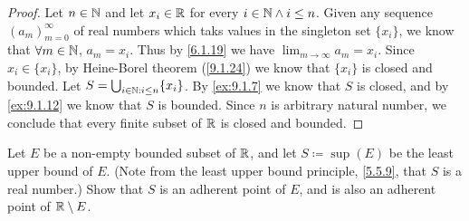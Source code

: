 \begin{proof}
  Let \(n \in \mathbb{N}\) and let \(x_i \in \mathbb{R}\) for every \(i \in \mathbb{N} \land i \leq n\).
  Given any sequence \((a_m)_{m = 0}^\infty\) of real numbers which taks values in the singleton set \(\{x_i\}\), we know that \(\forall m \in \mathbb{N}\), \(a_m = x_i\).
  Thus by \cref{6.1.19} we have \(\lim_{m \to \infty} a_m = x_i\).
  Since \(x_i \in \{x_i\}\), by Heine-Borel theorem (\cref{9.1.24}) we know that \(\{x_i\}\) is closed and bounded.
  Let \(S = \bigcup_{i \in \mathbb{N} : i \leq n} \{x_i\}\).
  By \cref{ex:9.1.7} we know that \(S\) is closed, and by \cref{ex:9.1.12} we know that \(S\) is bounded.
  Since \(n\) is arbitrary natural number, we conclude that every finite subset of \(\mathbb{R}\) is closed and bounded.
\end{proof}

\begin{ex}\label{ex:9.1.15}
  Let \(E\) be a non-empty bounded subset of \(\mathbb{R}\), and let \(S \coloneqq \sup(E)\) be the least upper bound of \(E\).
  (Note from the least upper bound principle, \cref{5.5.9}, that \(S\) is a real number.)
  Show that \(S\) is an adherent point of \(E\), and is also an adherent point of \(\mathbb{R} \setminus E\).
\end{ex}

